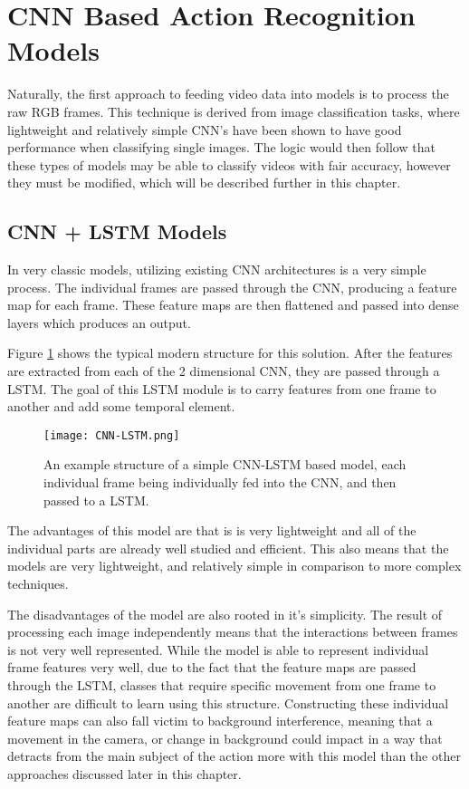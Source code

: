 \section{CNN Based Action Recognition Models}

Naturally, the first approach to feeding video data into models is to process the raw RGB frames. This technique is derived from image classification tasks, where lightweight and relatively simple CNN's have been shown to have good performance when classifying single images. The logic would then follow that these types of models may be able to classify videos with fair accuracy, however they must be modified, which will be described further in this chapter.

\subsection{CNN + LSTM Models}

In very classic models, utilizing existing CNN architectures is a very simple process. The individual frames are passed through the CNN, producing a feature map for each frame. These feature maps are then flattened and passed into dense layers which produces an output.

Figure \ref{fig:cnn-lstm} shows the typical modern structure for this solution. After the features are extracted from each of the 2 dimensional CNN, they are passed through a LSTM. The goal of this LSTM module is to carry features from one frame to another and add some temporal element.

\begin{figure}[ht]
	\texttt{[image: CNN-LSTM.png]}
	\centering
	\caption{An example structure of a simple CNN-LSTM based model, each individual frame being individually fed into the CNN, and then passed to a LSTM.}
	\label{fig:cnn-lstm}
\end{figure}

The advantages of this model are that is is very lightweight and all of the individual parts are already well studied and efficient. This also means that the models are very lightweight, and relatively simple in comparison to more complex techniques.

The disadvantages of the model are also rooted in it's simplicity. The result of processing each image independently means that the interactions between frames is not very well represented. While the model is able to represent individual frame features very well, due to the fact that the feature maps are passed through the LSTM, classes that require specific movement from one frame to another are difficult to learn using this structure. Constructing these individual feature maps can also fall victim to background interference, meaning that a movement in the camera, or change in background could impact in a way that detracts from the main subject of the action more with this model than the other approaches discussed later in this chapter.

